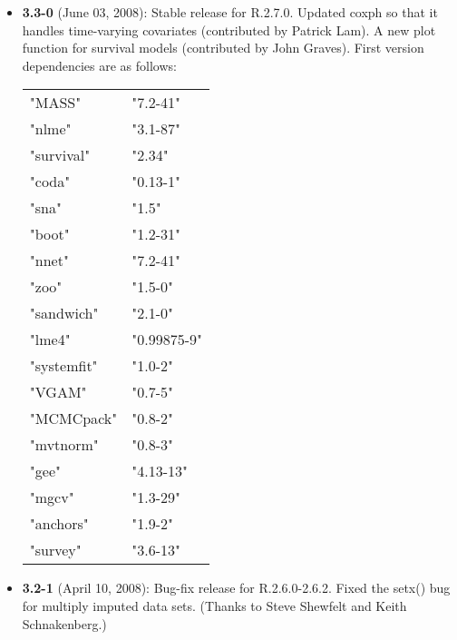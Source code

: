 \begin{itemize}
\item {\bf 3.3-0} (June 03, 2008): Stable release for R.2.7.0. Updated
  {\rm coxph} so that it handles time-varying covariates (contributed
  by Patrick Lam). A new plot function for survival models
  (contributed by John Graves). First version dependencies are as
  follows: \newline
\begin{tabular}{ll}\label{table.compact}
  "MASS"     & "7.2-41" \\
  "nlme"     & "3.1-87" \\
  "survival" & "2.34"    \\
  "coda"     & "0.13-1"  \\
  "sna"      & "1.5"     \\
  "boot"     & "1.2-31"  \\
  "nnet"     & "7.2-41"  \\
  "zoo"      & "1.5-0"   \\
  "sandwich" & "2.1-0"   \\
  "lme4"     & "0.99875-9" \\
  "systemfit" & "1.0-2" \\
  "VGAM"      & "0.7-5" \\
  "MCMCpack"  & "0.8-2" \\
  "mvtnorm"   & "0.8-3" \\
  "gee"       & "4.13-13" \\
  "mgcv"      & "1.3-29" \\
  "anchors"   & "1.9-2" \\
  "survey"    & "3.6-13" 
\end{tabular}
  
\item {\bf 3.2-1} (April 10, 2008): Bug-fix release for R.2.6.0-2.6.2.
  Fixed the {\rm setx()} bug for multiply imputed data sets. (Thanks
  to Steve Shewfelt and Keith Schnakenberg.)


\end{itemize}
